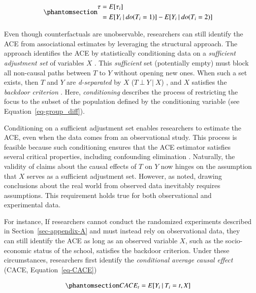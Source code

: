 \documentclass[
  authoryear,
  review,
  1p]{elsarticle}
\begin{document}
\begin{equation}\phantomsection\label{eq-ACE}{
\begin{aligned}
\tau & = E[\tau_{i}] \\
  & = E[Y_{i} \:|\:do(T_{i}=1)]- E[Y_{i} \:|\:do(T_{i}=2)]
\end{aligned}
}\end{equation}

Even though counterfactuals are unobservable, researchers can still
identify the ACE from associational estimates by leveraging the
structural approach. The approach identifies the ACE by statistically
conditioning data on a \emph{sufficient adjustment set} of variables
\(X\) \citep{Pearl_2009, Pearl_et_al_2016, Morgan_et_al_2014}. This
\emph{sufficient} set (potentially empty) must block all non-causal
paths between \(T\) to \(Y\) without opening new ones. When such a set
exists, then \(T\) and \(Y\) are \emph{d-separated} by \(X\)
(\(T \:\bot\:Y \:|\:X\)) \citep{Pearl_2009}, and \(X\) satisfies the
\emph{backdoor criterion} \citep[pp 37]{Neal_2020}. Here,
\emph{conditioning} describes the process of restricting the focus to
the subset of the population defined by the conditioning variable
\citep[pp.~32]{Neal_2020} (see Equation~\ref{eq-group_diff}).

Conditioning on a sufficient adjustment set enables researchers to
estimate the ACE, even when the data comes from an observational study.
This process is feasible because such conditioning ensures that the ACE
estimator satisfies several critical properties, including confounding
elimination \citep{Morgan_et_al_2014}. Naturally, the validity of claims
about the causal effects of \(T\) on \(Y\) now hinges on the assumption
that \(X\) serves as a sufficient adjustment set. However, as
\citet[pp.~150]{Kohler_et_al_2019} noted, drawing conclusions about the
real world from observed data inevitably requires assumptions. This
requirement holds true for both observational and experimental data.

For instance, If researchers cannot conduct the randomized experiments
described in Section~\ref{sec-appendix-A} and must instead rely on
observational data, they can still identify the ACE as long as an
observed variable \(X\), such as the socio-economic status of the
school, satisfies the backdoor criterion. Under these circumstances,
researchers first identify the \emph{conditional average causal effect}
(CACE, Equation~\ref{eq-CACE})

\begin{equation}\phantomsection\label{eq-CACE}{
CACE_{t} = E[Y_{i} \:|\:T_{i}=t, X]
}\end{equation}
\end{document}
